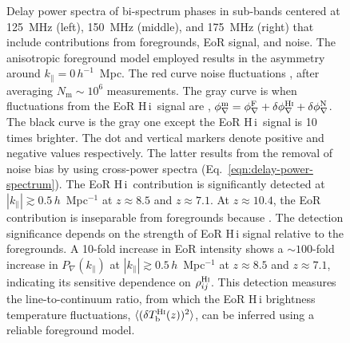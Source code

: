 \documentclass[
reprint,
superscriptaddress,
amsmath,
amssymb,
aps,
prd
]{revtex4-1}
\newcommand{\HI}{H\,{\sc i}}
\begin{document}
\begin{figure}[htb]
\caption{Delay power spectra of bi-spectrum phases in sub-bands centered at 125~MHz (left), 150~MHz (middle), and 175~MHz (right) that include contributions from foregrounds, EoR signal, and noise.   The anisotropic foreground model employed \cite{thy15a} results in the asymmetry around $k_\parallel=0\,h^{-1}$~Mpc. The red curve  noise fluctuations , after averaging $N_\textrm{m} \sim 10^6$ measurements. The gray curve is when fluctuations from the EoR \HI\ signal are , $\phi_\nabla^\textrm{m}=\phi_\nabla^\textrm{F}+\delta\phi_\nabla^\textrm{H{\sc i}}+\delta\phi_\nabla^\textrm{N}$. The black curve is  the gray one except the EoR \HI\ signal is 10 times brighter. The dot and vertical markers denote positive and negative values respectively. The latter results from the removal of noise bias by using cross-power spectra (Eq.~\ref{eqn:delay-power-spectrum}). The EoR \HI\ contribution is significantly detected at $|k_\parallel| \gtrsim 0.5\,h$~Mpc$^{-1}$ at $z\approx 8.5$ and $z\approx 7.1$. At $z\approx 10.4$, the EoR contribution is  inseparable from  foregrounds because . The detection significance depends on the strength of EoR H\,{\sc i} signal relative to the foregrounds. A 10-fold increase in EoR intensity shows a $\sim 100$-fold increase in $P_\nabla(k_\parallel)$ at $|k_\parallel| \gtrsim 0.5\,h$~Mpc$^{-1}$ at $z\approx 8.5$ and $z\approx 7.1$, indicating its sensitive dependence on $\rho_{ij}^\textrm{H{\sc i}}$. This detection measures the line-to-continuum ratio, from which the EoR H\,{\sc i} brightness temperature fluctuations, $\langle(\delta T_\textrm{b}^\textrm{H{\sc i}}(z))^2\rangle$, can be inferred using a reliable foreground model. \label{fig:cpdps}}
\end{figure}
\end{document}
